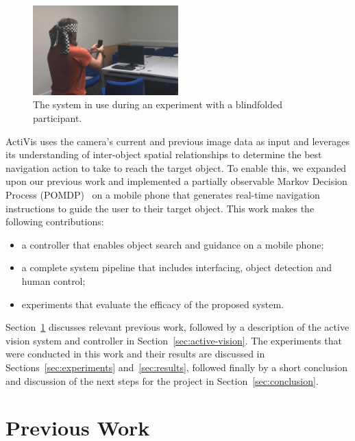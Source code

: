\documentclass[runningheads]{llncs}
\begin{document}
\begin{figure}
  \centering
  \includegraphics[width=0.5\textwidth]{figures/system_use.png}
  \caption{The system in use during an experiment with a blindfolded participant. }\label{fig:system-in-use}
\end{figure}

ActiVis uses the camera's current and previous image data as input and leverages its understanding of inter-object spatial relationships to determine the best navigation action to take to reach the target object.
To enable this, we expanded upon our previous work and implemented a partially observable Markov Decision Process (POMDP)~\cite{bellman1957markovian} on a mobile phone that generates real-time navigation instructions to guide the user to their target object.
This work makes the following contributions:

\begin{itemize}
  \item a controller that enables object search and guidance on a mobile phone;
  \item a complete system pipeline that includes interfacing, object detection and human control;
  \item experiments that evaluate the efficacy of the proposed system.
\end{itemize}

Section~\ref{sec:previous-work} discusses relevant previous work, followed by a description of the active vision system and controller in Section~\ref{sec:active-vision}.
The experiments that were conducted in this work and their results are discussed in Sections~\ref{sec:experiments} and~\ref{sec:results}, followed finally by a short conclusion and discussion of the next steps for the project in Section~\ref{sec:conclusion}.

\section{Previous Work}\label{sec:previous-work}
\end{document}

